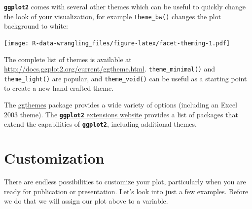 \documentclass[]{book}
\newenvironment{Shaded}{\begin{snugshade}}{\end{snugshade}}
\newcommand{\KeywordTok}[1]{\textcolor[rgb]{0.13,0.29,0.53}{\textbf{#1}}}
\newcommand{\DataTypeTok}[1]{\textcolor[rgb]{0.13,0.29,0.53}{#1}}
\newcommand{\StringTok}[1]{\textcolor[rgb]{0.31,0.60,0.02}{#1}}
\newcommand{\OtherTok}[1]{\textcolor[rgb]{0.56,0.35,0.01}{#1}}
\newcommand{\OperatorTok}[1]{\textcolor[rgb]{0.81,0.36,0.00}{\textbf{#1}}}
\newcommand{\NormalTok}[1]{#1}
\theoremstyle{definition}
\theoremstyle{definition}
\theoremstyle{definition}
\theoremstyle{remark}
\begin{document}
\textbf{\texttt{ggplot2}} comes with several other themes which can be
useful to quickly change the look of your visualization, for example
\texttt{theme\_bw()} changes the plot background to white:

\begin{Shaded}
\end{Shaded}

\texttt{[image: R-data-wrangling\_files/figure-latex/facet-theming-1.pdf]}

The complete list of themes is available at
\url{http://docs.ggplot2.org/current/ggtheme.html}.
\texttt{theme\_minimal()} and \texttt{theme\_light()} are popular, and
\texttt{theme\_void()} can be useful as a starting point to create a new
hand-crafted theme.

The
\href{https://cran.r-project.org/web/packages/ggthemes/vignettes/ggthemes.html}{ggthemes}
package provides a wide variety of options (including an Excel 2003
theme). The
\href{https://www.ggplot2-exts.org}{\textbf{\texttt{ggplot2}} extensions
website} provides a list of packages that extend the capabilities of
\textbf{\texttt{ggplot2}}, including additional themes.

\section{Customization}\label{customization}

There are endless possibilities to customize your plot, particularly
when you are ready for publication or presentation. Let's look into just
a few examples. Before we do that we will assign our plot above to a
variable.
\end{document}
